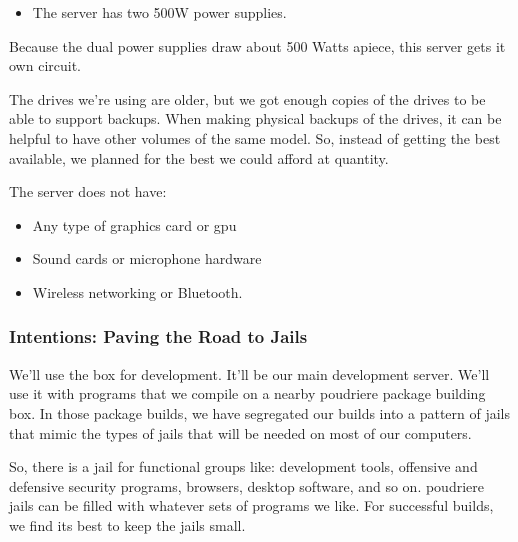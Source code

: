 \begin{itemize}
\begin{itemize}
			\item We have two for the \gls{os}.
			\item We'll leave the two on the  \gls{motherboard} mostly unused, except for our iDRAC connection.
			\begin{itemize}
				\item iDRAC is a proprietary baseboard controller.
				\item We could use it to power cycle the machine.
				\item There's a web interface that let's us know about  \gls{motherboard}-related facts.
				\item We cannot give a GELI \gls{password} through the console in our current setup.
			\end{itemize}
	\end{itemize}
	\item The server has two 500W power supplies.
\end{itemize}
Because the dual power supplies draw about 500 Watts apiece, this server gets it own circuit.

The drives we're using are older, but we got enough copies of the drives to be able to support backups.  When making physical backups of the drives, it can be helpful to have other volumes of the same model.  So, instead of getting the best available, we planned for the best we could afford at quantity.

The server does not have:
\begin{itemize}
	\item Any type of graphics card or \gls{gpu}
	\item Sound cards or microphone hardware
	\item Wireless networking or Bluetooth.
\end{itemize}
\subsubsection{Intentions:  Paving the Road to Jails}
We'll use the box for development.  It'll be our main development server.  We'll use it with prog\gls{ram}s that we compile on a nearby \gls{poudriere} package building box.  In those package builds, we have segregated our builds into a pattern of jails that mimic the types of jails that will be needed on most of our computers.

So, there is a \gls{jail} for functional groups like:  development tools, offensive and defensive security programs, browsers, desktop software, and so on.  \gls{poudriere} jails can be filled with whatever sets of programs we like.  For successful builds, we find its best to keep the jails small.

